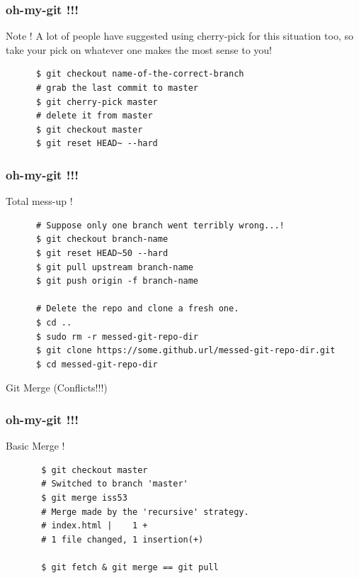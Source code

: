 \documentclass[10pt]{beamer}
\begin{document}
\begin{frame}[fragile]
  \frametitle{oh-my-git !!!}
  \begin{block}{Note !}
    A lot of people have suggested using cherry-pick for this situation too,
    so take your pick on whatever one makes the most sense to you!
  \end{block}
  \pause
  \begin{example}[Solution]
    \begin{verbatim}
      $ git checkout name-of-the-correct-branch
      # grab the last commit to master
      $ git cherry-pick master
      # delete it from master
      $ git checkout master
      $ git reset HEAD~ --hard
    \end{verbatim}
  \end{example}
\end{frame}

\begin{frame}[fragile]
  \frametitle{oh-my-git !!!}
  \begin{block}{Total mess-up !}
    \begin{verbatim}
      # Suppose only one branch went terribly wrong...!
      $ git checkout branch-name
      $ git reset HEAD~50 --hard
      $ git pull upstream branch-name
      $ git push origin -f branch-name

      # Delete the repo and clone a fresh one.
      $ cd ..
      $ sudo rm -r messed-git-repo-dir
      $ git clone https://some.github.url/messed-git-repo-dir.git
      $ cd messed-git-repo-dir
    \end{verbatim}
  \end{block}
\end{frame}

\begin{frame}
  \begin{center}
    \Huge{Git Merge (Conflicts!!!)}
  \end{center}
\end{frame}

\begin{frame}[fragile]
  \frametitle{oh-my-git !!!}
  \begin{block}{Basic Merge !}
    \begin{verbatim}
       $ git checkout master
       # Switched to branch 'master'
       $ git merge iss53
       # Merge made by the 'recursive' strategy.
       # index.html |    1 +
       # 1 file changed, 1 insertion(+)

       $ git fetch & git merge == git pull
    \end{verbatim}
  \end{block}
\end{frame}
\end{document}
